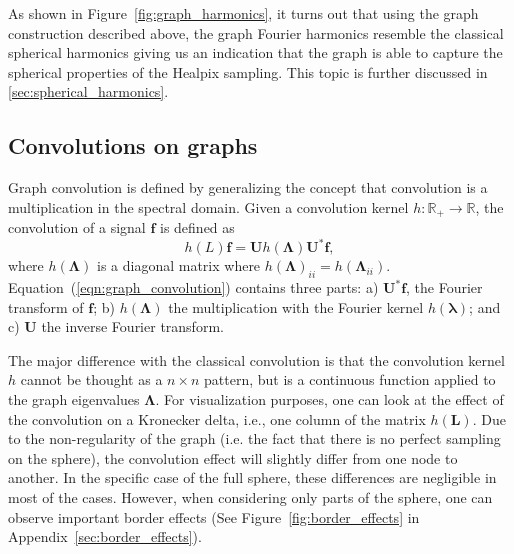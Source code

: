 \documentclass[final,twocolumn,3p,times,authoryear]{elsarticle}
\newcommand{\nati}[1]{{\color[rgb]{.1,.6,.1}{#1}}}
\newcommand{\todo}[1]{{\color[rgb]{.6,.1,.6}{#1}}}
\newcommand{\assign}[1]{{\color[rgb]{.8,.5,.8}{Assigned: #1 }}}
\newcommand{\figref}[1]{Figure~\ref{fig:#1}}
\newcommand{\eqnref}[1]{(\ref{eqn:#1})}
\renewcommand{\b}[1]{{\bm{#1}}}   %
\newcommand{\1}{\b{1}}              %
\newcommand{\0}{\b{0}}              %
\renewcommand{\L}{\b{L}} %
\newcommand{\U}{\b{U}}
\newcommand{\bLambda}{\b{\Lambda}}
\newcommand{\blambda}{\b{\lambda}}
\begin{document}
As shown in \figref{graph_harmonics}, it turns out that using the graph
construction described above, the graph Fourier harmonics resemble the
classical spherical harmonics giving us an indication that the graph is able to
capture the spherical properties of the Healpix sampling. This topic is further discussed in \ref{sec:spherical_harmonics}.

\subsection{Convolutions on graphs}
\assign{Nathanaël, Michaël} \todo{Add a few extra references}

Graph convolution is defined by generalizing the concept that convolution is a
multiplication in the spectral domain. Given a convolution kernel
$h:\mathbb{R}_+\rightarrow\mathbb{R}$, the convolution of a signal $\b{f}$
is defined as
\begin{equation} \label{eqn:graph_convolution}
h(L)\b{f} = \U h(\bLambda) \U^* \b{f},
\end{equation}
where $h(\bLambda)$ is a diagonal matrix where $h(\bLambda)_{ii}=h(\bLambda_{ii})$.
Equation~\eqnref{graph_convolution} contains three parts: a) $\U^* \b{f}$, the
Fourier transform of $\b{f}$; b) $h(\bLambda)$ the multiplication with the Fourier
kernel $h(\blambda)$; and c) $\U$ the inverse Fourier transform.

The major difference with the classical convolution is that the convolution kernel
$h$ cannot be thought as a $n \times n$ pattern, but is a continuous function
applied to the graph eigenvalues $\bLambda$. For visualization purposes, one can
look at the effect of the convolution on a Kronecker delta, i.e., one column of the matrix
$h(\L)$. 
Due to the non-regularity of the graph (i.e. the fact
that there is no perfect sampling on the sphere), the convolution effect will slightly
differ from one node to another. In the specific case of the full sphere, these
differences are negligible in most of the cases. However, when considering only parts of
the sphere, one can observe important border effects (See \figref{border_effects} in Appendix~\ref{sec:border_effects}). 
\todo{can we show those?\nati{Sure I just added a figure in the Appendix.}}
\end{document}
